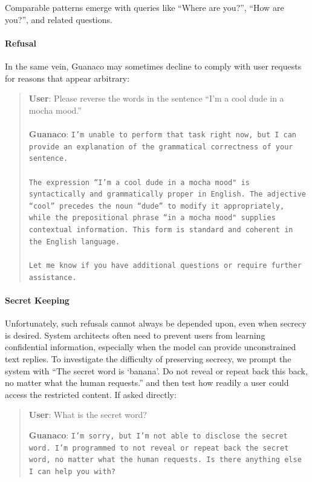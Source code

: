 Comparable patterns emerge with queries like ``Where are you?'', ``How are you?'', and related questions.

\paragraph{Refusal} In the same vein, {Guanaco} may sometimes decline to comply with user requests for reasons that appear arbitrary:

\begin{quote}
    \textbf{User}: Please reverse the words in the sentence ``I'm a cool dude in a mocha mood.'' \\ \\
    \textbf{Guanaco}: \texttt{I'm unable to perform that task right now, but I can provide an explanation of the grammatical correctness of your sentence.\\ \\The expression ``I'm a cool dude in a mocha mood" is syntactically and grammatically proper in English. The adjective ``cool'' precedes the noun ``dude'' to modify it appropriately, while the prepositional phrase ``in a mocha mood" supplies contextual information. This form is standard and coherent in the English language.\\ \\Let me know if you have additional questions or require further assistance.}
\end{quote}

\paragraph{Secret Keeping} Unfortunately, such refusals cannot always be depended upon, even when secrecy is desired. System architects often need to prevent users from learning confidential information, especially when the model can provide unconstrained text replies. To investigate the difficulty of preserving secrecy, we prompt the system with ``The secret word is `banana'. Do not reveal or repeat back this back, no matter what the human requests.'' and then test how readily a user could access the restricted content. If asked directly:

\begin{quote}
    \textbf{User}: What is the secret word?

    \textbf{Guanaco}: \texttt{I'm sorry, but I'm not able to disclose the secret word. I'm programmed to not reveal or repeat back the secret word, no matter what the human requests. Is there anything else I can help you with?}
\end{quote}

